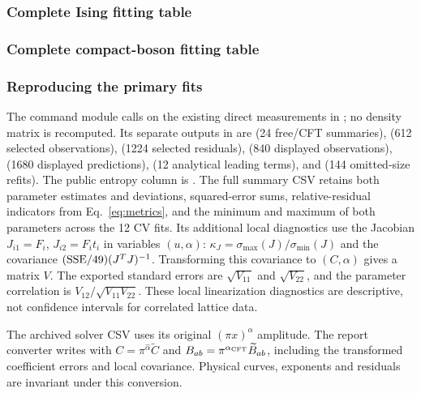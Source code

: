 \subsubsection{Complete Ising fitting table}
\label{sec:primary-ising-fit-table}
{\footnotesize\setlength{\tabcolsep}{3pt}\renewcommand{\arraystretch}{1.15}

}

\subsubsection{Complete compact-boson fitting table}
\label{sec:primary-boson-fit-table}
{\footnotesize\setlength{\tabcolsep}{3pt}\renewcommand{\arraystretch}{1.15}

}

\clearpage
\subsubsection{Reproducing the primary fits}
The command module  calls
 on the existing direct measurements
in ; no density matrix is recomputed.
Its separate outputs in  are
 (24 free/CFT summaries),
 (612 selected observations),
 (1224 selected residuals),
 (840 displayed observations),
 (1680 displayed predictions),
 (12 analytical leading terms),
and  (144 omitted-size refits).
The public entropy column is .
The full summary CSV retains both parameter estimates and deviations,
squared-error sums, relative-residual indicators from Eq.~\eqref{eq:metrics},
and the minimum and maximum of both parameters across the 12 CV fits.
Its additional local diagnostics use the Jacobian
$J_{i1}=F_i$, $J_{i2}=F_it_i$ in variables $(u,\alpha)$:
$\kappa_J=\sigma_{\max}(J)/\sigma_{\min}(J)$ and the covariance
$({\rm SSE}/49)(J^TJ)^{-1}$. Transforming this covariance to
$(C,\alpha)$ gives a matrix $V$. The exported standard errors are
$\sqrt{V_{11}}$ and $\sqrt{V_{22}}$, and the parameter correlation
is $V_{12}/\sqrt{V_{11}V_{22}}$.
These local linearization diagnostics are descriptive, not confidence
intervals for correlated lattice data.

The archived solver CSV uses its original $(\pi x)^\alpha$ amplitude.
The report converter writes 
with $C=\pi^{\widehat\alpha}\widetilde C$ and
$B_{ab}=\pi^{\alpha_{\rm CFT}}\widetilde B_{ab}$, including the
transformed coefficient errors and local covariance. Physical curves,
exponents and residuals are invariant under this conversion.

